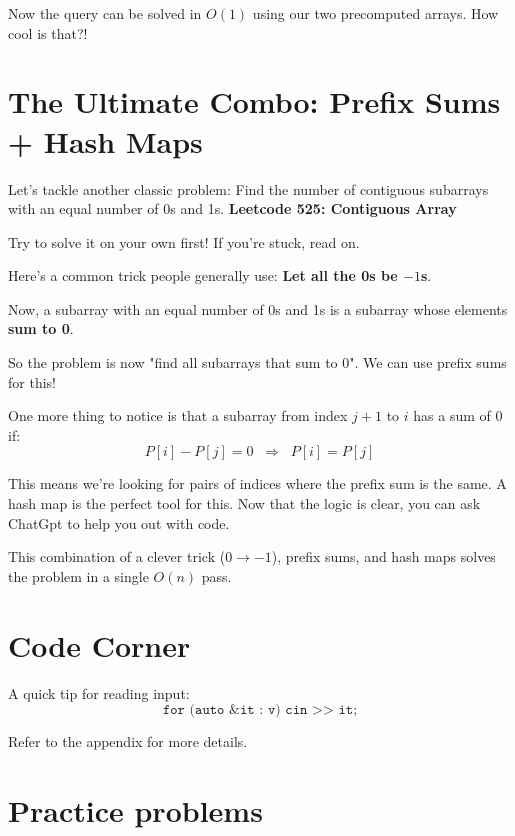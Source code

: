 Now the query can be solved in $O(1)$ using our two precomputed arrays. How cool is that?!

\section{The Ultimate Combo: Prefix Sums + Hash Maps}
Let's tackle another classic problem: Find the number of contiguous subarrays with an equal number of 0s and 1s. \textbf{Leetcode 525: Contiguous Array}

Try to solve it on your own first! If you're stuck, read on.

Here's a common trick people generally use: \textbf{Let all the 0s be $-1$s}.  

Now, a subarray with an equal number of 0s and 1s is a subarray whose elements \textbf{sum to 0}.  

So the problem is now "find all subarrays that sum to 0". We can use prefix sums for this! 

One more thing to notice is that a subarray from index $j+1$ to $i$ has a sum of 0 if:
\[
P[i] - P[j] = 0 \;\;\Longrightarrow\;\; P[i] = P[j]
\]

This means we're looking for pairs of indices where the prefix sum is the same. A hash map is the perfect tool for this. Now that the logic is clear, you can ask ChatGpt to help you out with code.

This combination of a clever trick ($0 \rightarrow -1$), prefix sums, and hash maps solves the problem in a single $O(n)$ pass.  

\section{Code Corner}
A quick tip for reading input:
\[
\texttt{for (auto \&it : v) cin >> it;}
\]

Refer to the appendix for more details.



\section{Practice problems}

